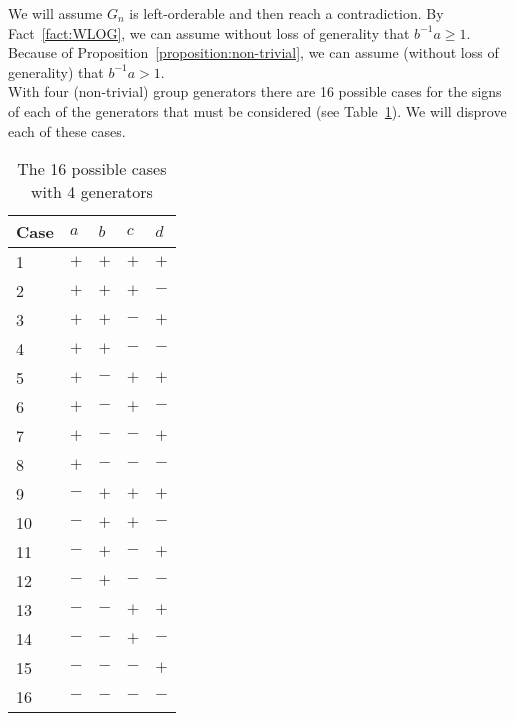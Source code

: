 \noindent{}We will assume $G_n$ is left-orderable and then reach a contradiction. By Fact~\ref{fact:WLOG}, we can assume without loss of generality that $b^{-1}a\geq1$. Because of Proposition~\ref{proposition:non-trivial}, we can assume (without loss of generality) that $b^{-1}a>1$.\\

\noindent{}With four (non-trivial) group generators there are 16 possible cases for the signs of each of the generators that must be considered (see Table~\ref{table:casesAll}). We will disprove each of these cases.



\begin{table}[ht]
\begin{center}
\begin{tabular}{l | l | l | l | l}
Case\hspace{10 pt} & $a$\hspace{10 pt} & $b$\hspace{10 pt} & $c$\hspace{10 pt} & $d$\hspace{10 pt} \\\hline\hline
1 & $+$ & $+$ & $+$ & $+$ \\\hline
2 & $+$ & $+$ & $+$ & $-$ \\\hline
3 & $+$ & $+$ & $-$ & $+$ \\\hline
4 & $+$ & $+$ & $-$ & $-$ \\\hline
5 & $+$ & $-$ & $+$ & $+$ \\\hline
6 & $+$ & $-$ & $+$ & $-$ \\\hline
7 & $+$ & $-$ & $-$ & $+$ \\\hline
8 & $+$ & $-$ & $-$ & $-$ \\\hline
9 & $-$ & $+$ & $+$ & $+$ \\\hline
10 & $-$ & $+$ & $+$ & $-$ \\\hline
11 & $-$ & $+$ & $-$ & $+$ \\\hline
12 & $-$ & $+$ & $-$ & $-$ \\\hline
13 & $-$ & $-$ & $+$ & $+$ \\\hline
14 & $-$ & $-$ & $+$ & $-$ \\\hline
15 & $-$ & $-$ & $-$ & $+$ \\\hline
16 & $-$ & $-$ & $-$ & $-$ 
\end{tabular}
\end{center}
\caption{The 16 possible cases with 4 generators}
\label{table:casesAll}
\end{table}

